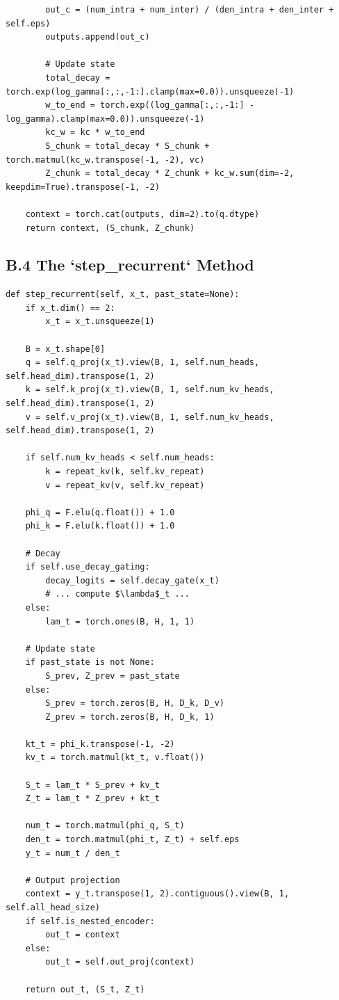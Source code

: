 \begin{lstlisting}
        out_c = (num_intra + num_inter) / (den_intra + den_inter + self.eps)
        outputs.append(out_c)
        
        # Update state
        total_decay = torch.exp(log_gamma[:,:,-1:].clamp(max=0.0)).unsqueeze(-1)
        w_to_end = torch.exp((log_gamma[:,:,-1:] - log_gamma).clamp(max=0.0)).unsqueeze(-1)
        kc_w = kc * w_to_end
        S_chunk = total_decay * S_chunk + torch.matmul(kc_w.transpose(-1, -2), vc)
        Z_chunk = total_decay * Z_chunk + kc_w.sum(dim=-2, keepdim=True).transpose(-1, -2)
    
    context = torch.cat(outputs, dim=2).to(q.dtype)
    return context, (S_chunk, Z_chunk)
\end{lstlisting}

\subsection{B.4 The `step\_recurrent` Method}

\begin{lstlisting}
def step_recurrent(self, x_t, past_state=None):
    if x_t.dim() == 2:
        x_t = x_t.unsqueeze(1)
    
    B = x_t.shape[0]
    q = self.q_proj(x_t).view(B, 1, self.num_heads, self.head_dim).transpose(1, 2)
    k = self.k_proj(x_t).view(B, 1, self.num_kv_heads, self.head_dim).transpose(1, 2)
    v = self.v_proj(x_t).view(B, 1, self.num_kv_heads, self.head_dim).transpose(1, 2)
    
    if self.num_kv_heads < self.num_heads:
        k = repeat_kv(k, self.kv_repeat)
        v = repeat_kv(v, self.kv_repeat)
    
    phi_q = F.elu(q.float()) + 1.0
    phi_k = F.elu(k.float()) + 1.0
    
    # Decay
    if self.use_decay_gating:
        decay_logits = self.decay_gate(x_t)
        # ... compute $\lambda$_t ...
    else:
        lam_t = torch.ones(B, H, 1, 1)
    
    # Update state
    if past_state is not None:
        S_prev, Z_prev = past_state
    else:
        S_prev = torch.zeros(B, H, D_k, D_v)
        Z_prev = torch.zeros(B, H, D_k, 1)
    
    kt_t = phi_k.transpose(-1, -2)
    kv_t = torch.matmul(kt_t, v.float())
    
    S_t = lam_t * S_prev + kv_t
    Z_t = lam_t * Z_prev + kt_t
    
    num_t = torch.matmul(phi_q, S_t)
    den_t = torch.matmul(phi_t, Z_t) + self.eps
    y_t = num_t / den_t
    
    # Output projection
    context = y_t.transpose(1, 2).contiguous().view(B, 1, self.all_head_size)
    if self.is_nested_encoder:
        out_t = context
    else:
        out_t = self.out_proj(context)
    
    return out_t, (S_t, Z_t)
\end{lstlisting}

